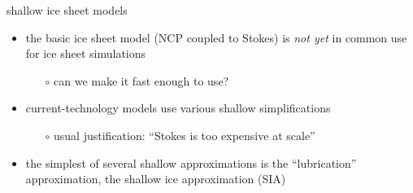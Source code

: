 \documentclass[svgnames,
               hyperref={colorlinks,citecolor=DeepPink4,linkcolor=FireBrick,urlcolor=Maroon},
               usepdftitle=false]  %
               {beamer}
\begin{document}
\begin{frame}{shallow ice sheet models}

\begin{itemize}
\item the basic ice sheet model (NCP coupled to Stokes) is \emph{not yet} in common use for ice sheet simulations
    \begin{itemize}
    \item[$\circ$] \alert{can we make it fast enough to use?}
    \end{itemize}

\smallskip
\item current-technology models use various shallow simplifications
    \begin{itemize}
    \item[$\circ$] usual justification: ``Stokes is too expensive at scale''
    \end{itemize}
\item the simplest of several shallow approximations is the ``lubrication'' approximation, the \alert{shallow ice approximation} (SIA)

\smallskip
\end{itemize}
\end{frame}
\end{document}
